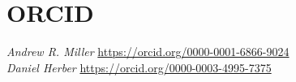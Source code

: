\documentclass[num-refs]{wiley-article}
\begin{document}
\section{ORCID}

\emph{Andrew R. Miller} \url{https://orcid.org/0000-0001-6866-9024}\\
\emph{Daniel Herber} \url{https://orcid.org/0000-0003-4995-7375}

\printendnotes


\end{document}
